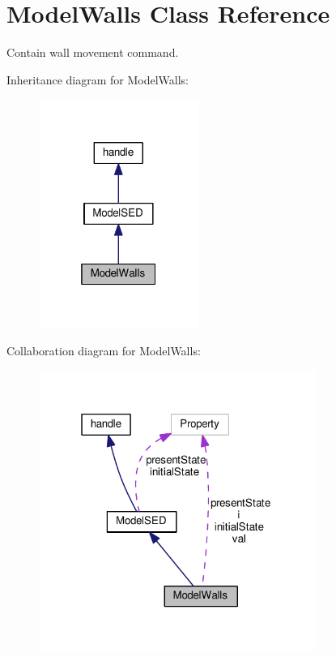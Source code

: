\hypertarget{class_model_walls}{}\section{Model\+Walls Class Reference}
\label{class_model_walls}


Contain wall movement command.  




Inheritance diagram for Model\+Walls\+:\nopagebreak
\begin{figure}[H]
\begin{center}
\leavevmode
\includegraphics[width=148pt]{class_model_walls__inherit__graph}
\end{center}
\end{figure}


Collaboration diagram for Model\+Walls\+:\nopagebreak
\begin{figure}[H]
\begin{center}
\leavevmode
\includegraphics[width=256pt]{class_model_walls__coll__graph}
\end{center}
\end{figure}
